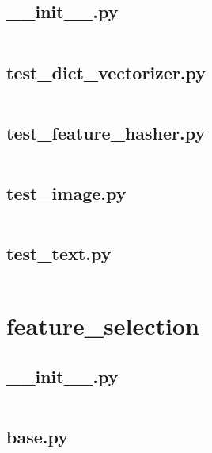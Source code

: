 \documentclass{article}
\begin{document}
\subsection{\_\_init\_\_.py}
\inputminted{python}{/home/dufferzafar/dev/@clones/scikit-learn/sklearn/feature_extraction/tests/__init__.py}
\newpage

\subsection{test\_dict\_vectorizer.py}
\inputminted{python}{/home/dufferzafar/dev/@clones/scikit-learn/sklearn/feature_extraction/tests/test_dict_vectorizer.py}
\newpage

\subsection{test\_feature\_hasher.py}
\inputminted{python}{/home/dufferzafar/dev/@clones/scikit-learn/sklearn/feature_extraction/tests/test_feature_hasher.py}
\newpage

\subsection{test\_image.py}
\inputminted{python}{/home/dufferzafar/dev/@clones/scikit-learn/sklearn/feature_extraction/tests/test_image.py}
\newpage

\subsection{test\_text.py}
\inputminted{python}{/home/dufferzafar/dev/@clones/scikit-learn/sklearn/feature_extraction/tests/test_text.py}
\newpage

\section{feature\_selection}

\subsection{\_\_init\_\_.py}
\inputminted{python}{/home/dufferzafar/dev/@clones/scikit-learn/sklearn/feature_selection/__init__.py}
\newpage

\subsection{base.py}
\inputminted{python}{/home/dufferzafar/dev/@clones/scikit-learn/sklearn/feature_selection/base.py}
\newpage
\end{document}
